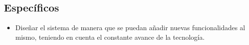 \subsection{Específicos}
\begin{itemize}
	\item Diseñar el sistema de manera que se puedan añadir nuevas funcionalidades al mismo, teniendo en cuenta el constante avance de la tecnología.
\end{itemize}
